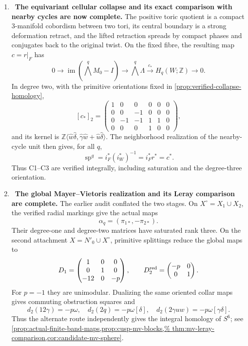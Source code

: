 \begin{enumerate}[leftmargin=1.8em,itemsep=.65em]
\item \Verified\ \textbf{The equivariant cellular collapse and its exact
comparison with nearby cycles are now complete.}
The positive toric quotient is a compact $3$-manifold cobordism between two
tori, its central boundary is a strong deformation retract, and the lifted
retraction spreads by compact phases and conjugates back to the original
twist.  On the fixed fibre, the resulting map $c=r|_F$ has
\[
0\longrightarrow\operatorname{im}(\textstyle\bigwedge^qM_0-I)
\longrightarrow\textstyle\bigwedge^q\Lambda
\xrightarrow{c_*}H_q(W;\mathbb Z)\longrightarrow0.
\]
In degree two, with the primitive orientations fixed in
\cref{prop:verified-collapse-homology},
\[
[c_*]_2=
\begin{pmatrix}
1&0&0&0&0&0\\
0&0&-1&0&0&0\\
0&-1&-1&1&1&0\\
0&0&0&1&0&0
\end{pmatrix},
\]
and its kernel is
$\mathbb Z\langle\widehat w\widehat\delta,
\widehat\gamma\widehat w+\widehat u\widehat\delta\rangle$.
The neighborhood realization of the nearby-cycle unit then gives, for all
$q$,
\[
\operatorname{sp}^q=i_F^*(i_W^*)^{-1}=i_F^*r^*=c^*.
\]
Thus C1--C3 are verified integrally, including saturation and the
degree-three orientation.

\item \Verified\ \textbf{The global Mayer--Vietoris realization and its
Leray comparison are complete.}
The earlier audit conflated the two stages.  On
$X^\circ=X_1\cup X_2$, the verified radial markings give the actual maps
\[
 \alpha_q=(\pi_{1*},-\pi_{2*}).
\]
Their degree-one and degree-two matrices have saturated rank three.  On the
second attachment $X=N'_0\cup X^\circ$, primitive splittings reduce the
global maps to
\[
 D_1=\begin{pmatrix}1&0&0\\0&1&0\\-12&0&-p\end{pmatrix},
 \qquad
 D_2^{\rm red}=\begin{pmatrix}-p&0\\0&1\end{pmatrix}.
\]
For $p=-1$ they are unimodular.  Dualizing the same oriented collar maps
gives commuting obstruction squares and
\[
 d_2(12\gamma)=-p\omega,\quad
 d_2(2q)=-p\omega[\delta],\quad
 d_2(2\gamma uw)=-p\omega[\gamma\delta].
\]
Thus the alternate route independently gives the integral homology of
$S^6$; see
\cref{prop:actual-finite-band-maps,prop:cusp-mv-blocks,%
thm:mv-leray-comparison,cor:candidate-mv-sphere}.


\end{enumerate}
